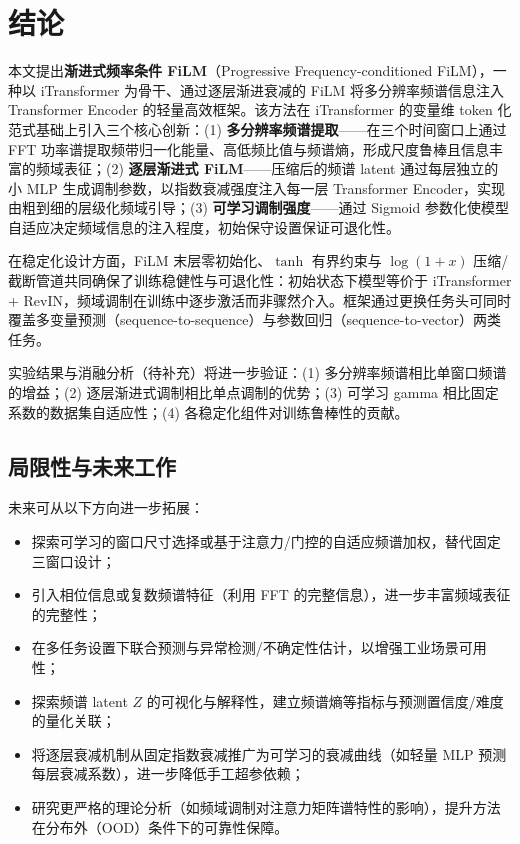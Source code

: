 \section{结论}
\label{sec:conclusion}

本文提出\textbf{渐进式频率条件 FiLM}（Progressive Frequency-conditioned FiLM），一种以 iTransformer 为骨干、通过逐层渐进衰减的 FiLM 将多分辨率频谱信息注入 Transformer Encoder 的轻量高效框架。该方法在 iTransformer 的变量维 token 化范式基础上引入三个核心创新：(1) \textbf{多分辨率频谱提取}——在三个时间窗口上通过 FFT 功率谱提取频带归一化能量、高低频比值与频谱熵，形成尺度鲁棒且信息丰富的频域表征；(2) \textbf{逐层渐进式 FiLM}——压缩后的频谱 latent 通过每层独立的小 MLP 生成调制参数，以指数衰减强度注入每一层 Transformer Encoder，实现由粗到细的层级化频域引导；(3) \textbf{可学习调制强度}——通过 Sigmoid 参数化使模型自适应决定频域信息的注入程度，初始保守设置保证可退化性。

在稳定化设计方面，FiLM 末层零初始化、\(\tanh\) 有界约束与 \(\log(1+x)\) 压缩/截断管道共同确保了训练稳健性与可退化性：初始状态下模型等价于 iTransformer + RevIN，频域调制在训练中逐步激活而非骤然介入。框架通过更换任务头可同时覆盖多变量预测（sequence-to-sequence）与参数回归（sequence-to-vector）两类任务。

实验结果与消融分析（待补充）将进一步验证：(1) 多分辨率频谱相比单窗口频谱的增益；(2) 逐层渐进式调制相比单点调制的优势；(3) 可学习 gamma 相比固定系数的数据集自适应性；(4) 各稳定化组件对训练鲁棒性的贡献。

\subsection{局限性与未来工作}
未来可从以下方向进一步拓展：
\begin{itemize}
  \item 探索可学习的窗口尺寸选择或基于注意力/门控的自适应频谱加权，替代固定三窗口设计；
  \item 引入相位信息或复数频谱特征（利用 FFT 的完整信息），进一步丰富频域表征的完整性；
  \item 在多任务设置下联合预测与异常检测/不确定性估计，以增强工业场景可用性；
  \item 探索频谱 latent \(Z\) 的可视化与解释性，建立频谱熵等指标与预测置信度/难度的量化关联；
  \item 将逐层衰减机制从固定指数衰减推广为可学习的衰减曲线（如轻量 MLP 预测每层衰减系数），进一步降低手工超参依赖；
  \item 研究更严格的理论分析（如频域调制对注意力矩阵谱特性的影响），提升方法在分布外（OOD）条件下的可靠性保障。
\end{itemize}

